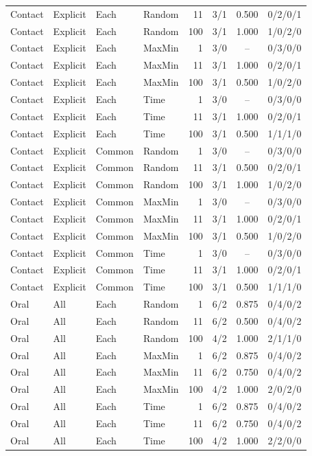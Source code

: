 \begin{longtable}{llllrrcc}
Contact & Explicit & Each & Random & 11 & 3/1 & 0.500 & 0/2/0/1 \\
Contact & Explicit & Each & Random & 100 & 3/1 & 1.000 & 1/0/2/0 \\
Contact & Explicit & Each & MaxMin & 1 & 3/0 & -- & 0/3/0/0 \\
Contact & Explicit & Each & MaxMin & 11 & 3/1 & 1.000 & 0/2/0/1 \\
Contact & Explicit & Each & MaxMin & 100 & 3/1 & 0.500 & 1/0/2/0 \\
Contact & Explicit & Each & Time & 1 & 3/0 & -- & 0/3/0/0 \\
Contact & Explicit & Each & Time & 11 & 3/1 & 1.000 & 0/2/0/1 \\
Contact & Explicit & Each & Time & 100 & 3/1 & 0.500 & 1/1/1/0 \\
Contact & Explicit & Common & Random & 1 & 3/0 & -- & 0/3/0/0 \\
Contact & Explicit & Common & Random & 11 & 3/1 & 0.500 & 0/2/0/1 \\
Contact & Explicit & Common & Random & 100 & 3/1 & 1.000 & 1/0/2/0 \\
Contact & Explicit & Common & MaxMin & 1 & 3/0 & -- & 0/3/0/0 \\
Contact & Explicit & Common & MaxMin & 11 & 3/1 & 1.000 & 0/2/0/1 \\
Contact & Explicit & Common & MaxMin & 100 & 3/1 & 0.500 & 1/0/2/0 \\
Contact & Explicit & Common & Time & 1 & 3/0 & -- & 0/3/0/0 \\
Contact & Explicit & Common & Time & 11 & 3/1 & 1.000 & 0/2/0/1 \\
Contact & Explicit & Common & Time & 100 & 3/1 & 0.500 & 1/1/1/0 \\
Oral & All & Each & Random & 1 & 6/2 & 0.875 & 0/4/0/2 \\
Oral & All & Each & Random & 11 & 6/2 & 0.500 & 0/4/0/2 \\
Oral & All & Each & Random & 100 & 4/2 & 1.000 & 2/1/1/0 \\
Oral & All & Each & MaxMin & 1 & 6/2 & 0.875 & 0/4/0/2 \\
Oral & All & Each & MaxMin & 11 & 6/2 & 0.750 & 0/4/0/2 \\
Oral & All & Each & MaxMin & 100 & 4/2 & 1.000 & 2/0/2/0 \\
Oral & All & Each & Time & 1 & 6/2 & 0.875 & 0/4/0/2 \\
Oral & All & Each & Time & 11 & 6/2 & 0.750 & 0/4/0/2 \\
Oral & All & Each & Time & 100 & 4/2 & 1.000 & 2/2/0/0 \\

\end{longtable}
